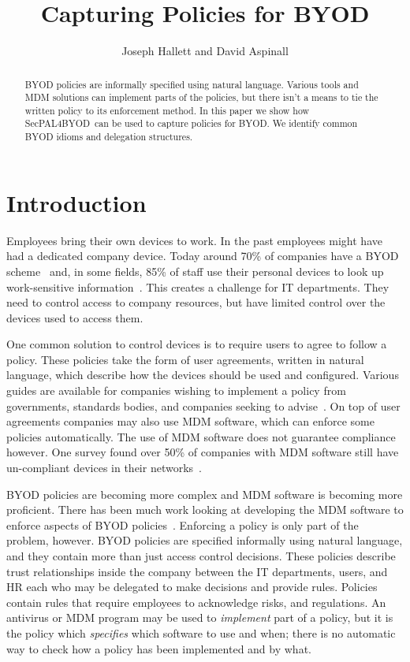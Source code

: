 \documentclass{llncs}
\title{Capturing Policies for BYOD}
\author{Joseph Hallett and David Aspinall}
\institute{University of Edinburgh}
\newcommand{\AppPAL}[0]{SecPAL4BYOD}
\begin{document}
\maketitle
\begin{abstract}
  BYOD policies are informally specified using natural language.
  Various tools and \ac{MDM} solutions can implement parts of the policies, but there isn't a means to tie the written policy to its enforcement method.
  In this paper we show how \AppPAL~can be used to capture policies for BYOD.
  We identify common BYOD idioms and delegation structures.
\end{abstract}
\section{Introduction}
\label{sec:intro}

Employees bring their own devices to work.
In the past employees might have had a dedicated company device.
Today around 70\% of companies have a BYOD scheme~\cite{schulze_byod_2016} and, in some fields,
  85\% of staff use their personal devices to look up work-sensitive information~\cite{patel_uk_2015}.
This creates a challenge for IT departments.
They need to control access to company resources, but have limited control over the devices used to access them.

One common solution to control devices is to require users to agree to follow a policy.
These policies take the form of user agreements, written in natural language, which describe how the devices should be used and configured.
Various guides are available for companies wishing to implement a policy from governments, standards bodies, and companies seeking to advise~\cite{nicholas_r._c._guerin_security_2008,souppaya_guidelines_????,hp_byod_????,cesg_byod_2015}.
On top of user agreements companies may also use \ac{MDM} software, which can enforce some policies automatically.
The use of \ac{MDM} software does not guarantee compliance however.
One survey found over 50\% of companies with \ac{MDM} software still have un-compliant devices in their networks~\cite{mobileiron_security_labs_q4_2015}.

BYOD policies are becoming more complex and \ac{MDM} software is becoming more proficient.
There has been much work looking at developing the \ac{MDM} software to enforce aspects of BYOD policies~\cite{costantino_towards_2013,martinelli_enhancing_2016,armando_enabling_2014}.
Enforcing a policy is only part of the problem, however.
BYOD policies are specified informally using natural language, and they contain more than just access control decisions.
These policies describe trust relationships inside the company between the IT departments, users, and HR each who may be delegated to make decisions and provide rules.
Policies contain rules that require employees to acknowledge risks, and regulations.
An antivirus or \ac{MDM} program may be used to \emph{implement} part of a policy, but it is the policy which \emph{specifies} which software to use and when; there is no automatic way to check how a policy has been implemented and by what.
\end{document}
